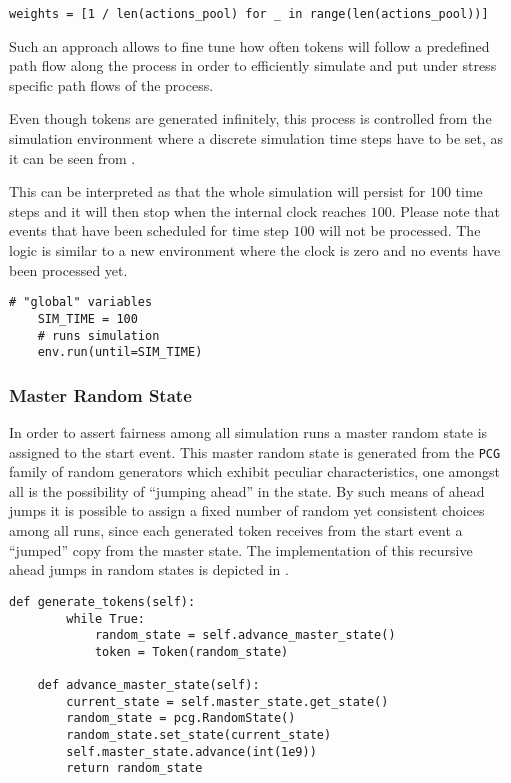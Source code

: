 \begin{lstlisting}[caption=Probability weights vector for each path flow,label=lst:probabilities_path_flow,style=CustomPython]
    weights = [1 / len(actions_pool) for _ in range(len(actions_pool))]
\end{lstlisting}

Such an approach allows to fine tune how often tokens will follow a predefined path flow along the process in order to efficiently simulate and put under stress specific path flows of the process.

Even though tokens are generated infinitely, this process is controlled from the simulation environment where a discrete simulation time steps have to be set, as it can be seen from .

This can be interpreted as that the whole simulation will persist for $100$ time steps and it will then stop when the internal clock reaches $100$. Please note that events that have been scheduled for time step $100$ will not be processed. The logic is similar to a new environment where the clock is zero and no events have been processed yet.

\begin{lstlisting}[caption=Starting the simulation with discrete time steps,label=lst:simulation_steps,style=CustomPython]
    # "global" variables
    SIM_TIME = 100
    # runs simulation
    env.run(until=SIM_TIME)
\end{lstlisting}

\subsubsection{Master Random State}

In order to assert fairness among all simulation runs a master random state is assigned to the start event. This master random state is generated from the \texttt{PCG} family of random generators which exhibit peculiar characteristics, one amongst all is the possibility of ``jumping ahead'' in the state. By such means of ahead jumps it is possible to assign a fixed number of random yet consistent choices among all runs, since each generated token receives from the start event a ``jumped'' copy from the master state. The implementation of this recursive ahead jumps in random states is depicted in .

\begin{lstlisting}[caption=Master random state jump ahead,label=lst:random_state_jump,style=CustomPython]
    def generate_tokens(self):
        while True:
            random_state = self.advance_master_state()
            token = Token(random_state)

    def advance_master_state(self):
        current_state = self.master_state.get_state()
        random_state = pcg.RandomState()
        random_state.set_state(current_state)
        self.master_state.advance(int(1e9))
        return random_state
\end{lstlisting}


